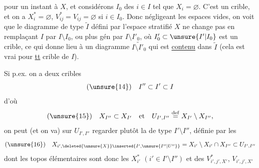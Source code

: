  pour un instant à $X$, et considérons   $I_0$ des $i\in I$ tel que $X_i=\varnothing$. C'est un crible, et on a $X_i^*=\varnothing$, $V_{ij}^*=V_{ij}=\varnothing$ si $i\in I_0$. Donc négligeant les espaces vides, on voit que le diagramme de type $\widetilde I$ défini par l'espace stratifié $X$ ne change pas  en remplaçant $I$ par $I\setminus I_0$, ou plus gén par $I\setminus I'_0$, où $I'_0\subset\unsure{I'|I_0}$ est un crible, ce qui donne lieu à un diagramme $\widetilde{I\setminus I'_0}$ qui est \uline{contenu} dans $\widetilde I$ (cela est vrai pour \uline{tt} crible de $I$).

Si p.ex. on a deux cribles
\[
(\unsure{14})\quad I''\subset I'\subset I
\]
d'où
\[
(\unsure{15})\quad X_{I''}\subset X_{I'}\quad\text{et}\quad U_{I',I''}\overset{\mathrm{def}}{=}X_{I'}\setminus X_{I''},
\]
on peut  (et on va) sur $U_{I',I''}$ regarder plutôt la   de type $I'\setminus I''$, définie par les
\[
(\unsure{16})\quad X_{i',\deleted{\unsure{X}}\inserted{I',\unsure{I''|U''}}}=X_{i'}\setminus X_{i'}\cap X_{I''}\subset U_{I',I''}
\]
dont les topos élémentaires sont donc les $X_{i'}^*$ $(i'\in I'\setminus I'')$ et des $V^*_{i',j',X'}$, $V_{i',j',X'}$

